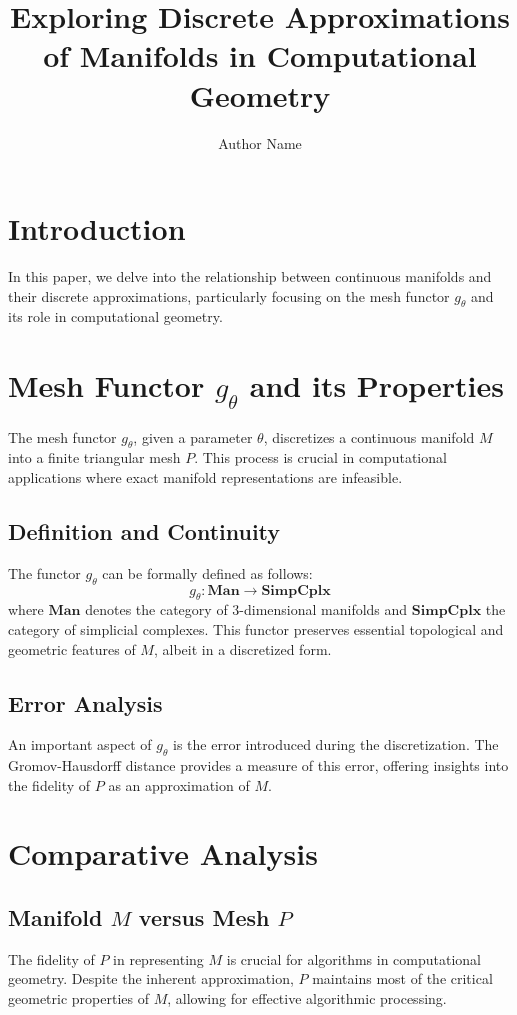 \documentclass{article}
\title{Exploring Discrete Approximations of Manifolds in Computational Geometry}
\author{Author Name}
\date{}
\begin{document}
\maketitle

\section{Introduction}
In this paper, we delve into the relationship between continuous manifolds and their discrete approximations, particularly focusing on the mesh functor \( g_\theta \) and its role in computational geometry.

\section{Mesh Functor \( g_\theta \) and its Properties}
The mesh functor \( g_\theta \), given a parameter \( \theta \), discretizes a continuous manifold \( M \) into a finite triangular mesh \( P \). This process is crucial in computational applications where exact manifold representations are infeasible. 

\subsection{Definition and Continuity}
The functor \( g_\theta \) can be formally defined as follows:
\[ g_\theta : \mathbf{Man} \rightarrow \mathbf{SimpCplx} \]
where \( \mathbf{Man} \) denotes the category of 3-dimensional manifolds and \( \mathbf{SimpCplx} \) the category of simplicial complexes. This functor preserves essential topological and geometric features of \( M \), albeit in a discretized form.

\subsection{Error Analysis}
An important aspect of \( g_\theta \) is the error introduced during the discretization. The Gromov-Hausdorff distance provides a measure of this error, offering insights into the fidelity of \( P \) as an approximation of \( M \).

\section{Comparative Analysis}
\subsection{Manifold \( M \) versus Mesh \( P \)}
The fidelity of \( P \) in representing \( M \) is crucial for algorithms in computational geometry. Despite the inherent approximation, \( P \) maintains most of the critical geometric properties of \( M \), allowing for effective algorithmic processing.
\end{document}
